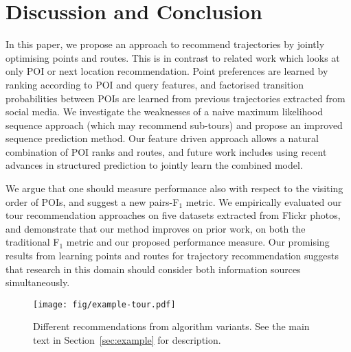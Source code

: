 
\section{Discussion and Conclusion}
\label{sec:conclusion}

In this paper, we propose an approach to recommend trajectories
by jointly optimising points and routes.
This is in contrast to related work which looks at only POI %
or next location recommendation.
Point preferences are learned by ranking according to POI and query features,
and factorised transition probabilities between POIs
are learned from previous trajectories extracted
from social media.
We investigate the weaknesses of a naive maximum likelihood sequence approach (which
may recommend sub-tours) and propose an improved sequence prediction method.
Our feature driven approach allows a natural combination of POI ranks and routes, and
future work includes using recent advances in structured prediction to jointly
learn the combined model.

We argue that one should measure performance also with respect to the visiting order of POIs,
and suggest a new pairs-F$_1$ metric.
We empirically evaluated our tour recommendation approaches on five datasets extracted from
Flickr photos, and demonstrate that our method improves on prior work,
on both the traditional F$_1$ metric and our proposed performance measure.
Our promising results from learning points and routes for trajectory recommendation suggests
that research in this domain should consider both information sources simultaneously.


\begin{figure*}[t]
	\centering
	\texttt{[image: fig/example-tour.pdf]}
	\caption{Different recommendations from algorithm variants.
    See the main text in Section~\ref{sec:example} for description.}
	\label{fig:exampleresult}
\end{figure*}
